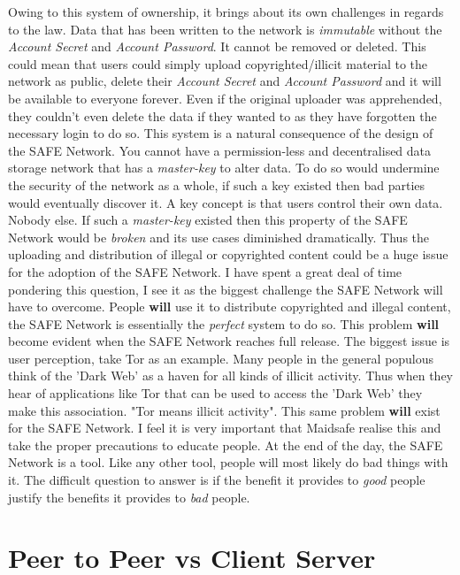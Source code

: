 Owing to this system of ownership, it brings about its own challenges in regards to the law. Data that has been written to the network is \textit{immutable} without the \textit{Account Secret} and \textit{Account Password}. It cannot be removed or deleted. This could mean that users could simply upload copyrighted/illicit material to the network as public, delete their \textit{Account Secret} and \textit{Account Password} and it will be available to everyone forever. Even if the original uploader was apprehended, they couldn't even delete the data if they wanted to as they have forgotten the necessary login to do so. This system is a natural consequence of the design of the SAFE Network. You cannot have a permission-less and decentralised data storage network that has a \textit{master-key} to alter data. To do so would undermine the security of the network as a whole, if such a key existed then bad parties would eventually discover it. A key concept is that users control their own data. Nobody else. If such a \textit{master-key} existed then this property of the SAFE Network would be \textit{broken} and its use cases diminished dramatically. Thus the uploading and distribution of illegal or copyrighted content could be a huge issue for the adoption of the SAFE Network. I have spent a great deal of time pondering this question, I see it as the biggest challenge the SAFE Network will have to overcome. People \textbf{will} use it to distribute copyrighted and illegal content, the SAFE Network is essentially the \textit{perfect} system to do so. This problem \textbf{will} become evident when the SAFE Network reaches full release. The biggest issue is user perception, take Tor as an example. Many people in the general populous think of the 'Dark Web' as a haven for all kinds of illicit activity. Thus when they hear of applications like Tor that can be used to access the 'Dark Web' they make this association. "Tor means illicit activity". This same problem \textbf{will} exist for the SAFE Network. I feel it is very important that Maidsafe realise this and take the proper precautions to educate people. At the end of the day, the SAFE Network is a tool. Like any other tool, people will most likely do bad things with it. The difficult question to answer is if the benefit it provides to \textit{good} people justify the benefits it provides to \textit{bad} people.
 
\section{Peer to Peer vs Client Server}


